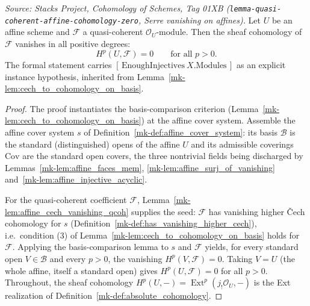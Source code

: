 \begin{lemma}
  \label{mk-lem:affine_serre_vanishing}

  \textit{Source: Stacks Project, Cohomology of Schemes, Tag 01XB
  (\texttt{lemma-quasi-coherent-affine-cohomology-zero}, Serre vanishing on
  affines).}
  Let \(U\) be an affine scheme and \(\mathcal{F}\) a quasi-coherent
  \(\mathcal{O}_U\)-module. Then the sheaf cohomology of \(\mathcal{F}\) vanishes in
  all positive degrees:
  \[
    H^p(U, \mathcal{F}) = 0 \qquad \text{for all } p > 0.
  \]
  The formal statement carries \([\,\mathrm{EnoughInjectives}\ X.\mathrm{Modules}\,]\) as an
  explicit instance hypothesis, inherited from Lemma~\ref{mk-lem:cech_to_cohomology_on_basis}.
\end{lemma}
\begin{proof}
  The proof instantiates the basis-comparison criterion
  (Lemma~\ref{mk-lem:cech_to_cohomology_on_basis}) at the affine cover system. Assemble the affine cover
  system \(s\) of Definition~\ref{mk-def:affine_cover_system}: its basis \(\mathcal{B}\) is the
  standard (distinguished) opens of the affine \(U\) and its admissible coverings \(\mathrm{Cov}\) are
  the standard open covers, the three nontrivial fields being discharged by
  Lemmas~\ref{mk-lem:affine_faces_mem}, \ref{mk-lem:affine_surj_of_vanishing}
  and~\ref{mk-lem:affine_injective_acyclic}.

  For the quasi-coherent coefficient \(\mathcal{F}\), Lemma~\ref{mk-lem:affine_cech_vanishing_qcoh}
  supplies the seed: \(\mathcal{F}\) has vanishing higher {\v C}ech cohomology for \(s\)
  (Definition~\ref{mk-def:has_vanishing_higher_cech}), i.e.\ condition (3) of
  Lemma~\ref{mk-lem:cech_to_cohomology_on_basis} holds for \(\mathcal{F}\). Applying the
  basis-comparison lemma to \(s\) and \(\mathcal{F}\) yields, for every standard open
  \(V \in \mathcal{B}\) and every \(p > 0\), the vanishing \(H^p(V, \mathcal{F}) = 0\). Taking
  \(V = U\) (the whole affine, itself a standard open) gives \(H^p(U, \mathcal{F}) = 0\) for all
  \(p > 0\). Throughout, the sheaf cohomology \(H^p(U, -) = \operatorname{Ext}^p(j_!\mathcal{O}_U, -)\)
  is the Ext realization of Definition~\ref{mk-def:absolute_cohomology}.
\end{proof}

